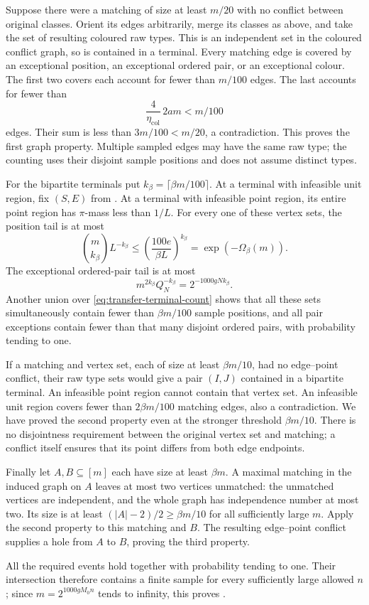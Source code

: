 Suppose there were a matching of size at least \(m/20\) with no
conflict between original classes.  Orient its edges arbitrarily,
merge its classes as above, and take the set of resulting coloured
raw types.  This is an independent set in the coloured conflict
graph, so is contained in a terminal.  Every matching edge is
covered by an exceptional position, an exceptional ordered pair,
or an exceptional colour.  The first two covers each account for
fewer than \(m/100\) edges.  The last accounts for fewer than
\[
 \frac4{\eta_{\mathrm{col}}}\,2am
 <m/100
\]
edges.  Their sum is less than \(3m/100<m/20\), a contradiction.
This proves the first graph property.  Multiple sampled edges
may have the same raw type; the counting uses their disjoint
sample positions and does not assume distinct types.

For the bipartite terminals put \(k_\beta=\lceil\beta m/100\rceil\).
At a terminal with infeasible unit region, fix \((S,E)\) from
.  At a terminal with infeasible point region,
its entire point region has \(\pi\)-mass less than \(1/L\).
For every one of these vertex sets, the position tail is at most
\[
 \binom m{k_\beta}L^{-k_\beta}
 \le\left(\frac{100e}{\beta L}\right)^{k_\beta}
 =\exp(-\Omega_\beta(m)).
\]
The exceptional ordered-pair tail is at most
\[
 m^{2k_\beta}Q_N^{-k_\beta}=2^{-1000gNk_\beta}.
\]
Another union over \eqref{eq:transfer-terminal-count} shows that
all these sets simultaneously contain fewer than \(\beta m/100\)
sample positions, and all pair exceptions contain fewer than that
many disjoint ordered pairs, with probability tending to one.

If a matching and vertex set, each of size at least
\(\beta m/10\), had no edge--point conflict, their raw type sets
would give a pair \((I,J)\) contained in a bipartite terminal.
An infeasible point region cannot contain that vertex set.  An
infeasible unit region covers fewer than \(2\beta m/100\)
matching edges, also a contradiction.  We have proved the second
property even at the stronger threshold \(\beta m/10\).
There is no disjointness requirement between the original vertex
set and matching; a conflict itself ensures that its point differs
from both edge endpoints.

Finally let \(A,B\subseteq[m]\) each have size at least \(\beta m\).
A maximal matching in the induced graph on \(A\) leaves at most
two vertices unmatched: the unmatched vertices are independent,
and the whole graph has independence number at most two.
Its size is at least \((|A|-2)/2\ge\beta m/10\) for all
sufficiently large \(m\).  Apply the second property to this
matching and \(B\).  The resulting edge--point conflict supplies
a hole from \(A\) to \(B\), proving the third property.

All the required events hold together with probability tending
to one.  Their intersection therefore contains a finite sample
for every sufficiently large allowed \(n\); since
\(m=2^{1000gM_0n}\) tends to infinity, this proves
.

